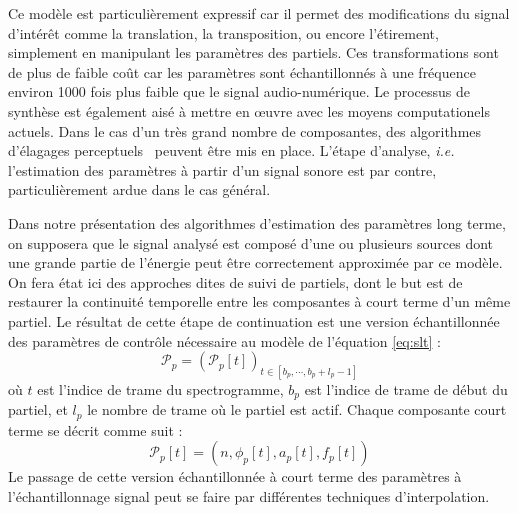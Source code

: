 Ce modèle est particulièrement expressif car il permet des modifications du signal d'intérêt comme la translation, la transposition, ou encore l'étirement, simplement en manipulant les paramètres des partiels. Ces transformations sont de plus de faible coût car les paramètres sont échantillonnés à une fréquence environ 1000 fois plus faible que le signal audio-numérique. Le processus de synthèse est également aisé à mettre en \oe{}uvre avec les moyens computationels actuels. Dans le cas d'un très grand nombre de composantes, des algorithmes d'élagages perceptuels~\cite{lagrangeDafx01} peuvent être mis en place. L'étape d'analyse, \textit{i.e.} l'estimation des paramètres à partir d'un signal sonore est par contre, particulièrement ardue dans le cas général.

Dans notre présentation des algorithmes d'estimation des paramètres long terme, on supposera que le signal analysé est composé d'une ou plusieurs sources dont une grande partie de l'énergie peut être correctement approximée par ce modèle. On fera état ici des approches dites de suivi de partiels, dont le but est de \og restaurer \fg la continuité temporelle entre les composantes à court terme d'un même partiel. Le résultat de cette étape de continuation est une version échantillonnée des paramètres de contrôle nécessaire au modèle de l'équation \ref{eq:slt} :
\begin{equation}
\mathcal{P}_{p}=\left(\mathcal{P}_{p}[t]\right)_{t \in\left[b_{p}, \cdots, b_{p}+l_{p}-1\right]}
\end{equation}
où $t$ est l'indice de trame du spectrogramme, $b_{p}$ est l'indice de trame de début du partiel, et $l_{p}$ le nombre de trame où le partiel est actif. Chaque composante court terme se décrit comme suit :
\begin{equation}
\mathcal{P}_{p}[t]=\left(n, \phi_{p}[t], a_{p}[t], f_{p}[t]\right)
\end{equation}
Le passage de cette version échantillonnée à court terme des paramètres à l'échantillonnage signal peut se faire par différentes techniques d'interpolation.

